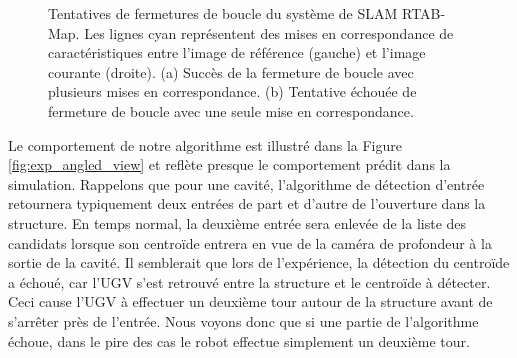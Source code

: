 \begin{figure}[ht]
  \centering
  \hfil
  \caption[Tentatives de fermetures de boucle du système de SLAM]{
    Tentatives de fermetures de boucle du système de SLAM RTAB-Map. Les lignes cyan représentent des mises en correspondance de caractéristiques entre l'image de référence (gauche) et l'image courante (droite).
    (a) Succès de la fermeture de boucle avec plusieurs mises en correspondance. (b) Tentative échouée de fermeture de boucle avec une seule mise en correspondance.
  }
  \label{fig:visual_loop_closure}
\end{figure}

Le comportement de notre algorithme est illustré dans la Figure \ref{fig:exp_angled_view} et reflète presque le comportement prédit dans la simulation. Rappelons que pour une cavité, l'algorithme de détection d'entrée retournera typiquement deux entrées de part et d'autre de l'ouverture dans la structure. En temps normal, la deuxième entrée sera enlevée de la liste des candidats lorsque son centroïde entrera en vue de la caméra de profondeur à la sortie de la cavité. Il semblerait que lors de l'expérience, la détection du centroïde a échoué, car l'UGV s'est retrouvé entre la structure et le centroïde à détecter. Ceci cause l'UGV à effectuer un deuxième tour autour de la structure avant de s'arrêter près de l'entrée. Nous voyons donc que si une partie de l'algorithme échoue, dans le pire des cas le robot effectue simplement un deuxième tour.

